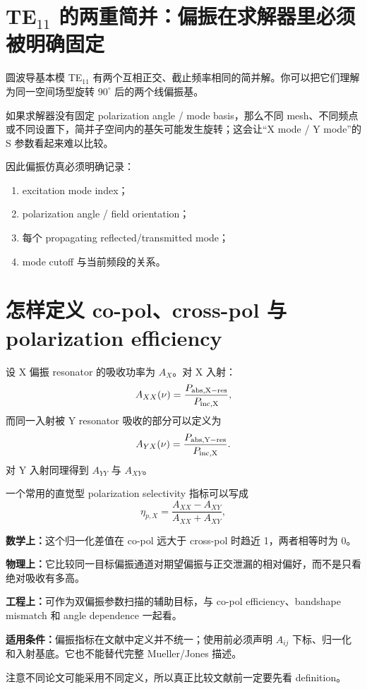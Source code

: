 \documentclass[11pt,a4paper,openany]{ctexrep}
\newcommand{\formulaexplain}[4]{%
\begin{formulaguidebox}
\textbf{\color{KidBlue}数学上：}#1\par
\textbf{\color{KidTeal}物理上：}#2\par
\textbf{\color{KidGold!55!black}工程上：}#3\par
\textbf{\color{KidRed}适用条件：}#4
\end{formulaguidebox}%
}
\begin{document}
\section{TE$_{11}$ 的两重简并：偏振在求解器里必须被明确固定}

圆波导基本模 TE$_{11}$ 有两个互相正交、截止频率相同的简并解。你可以把它们理解为同一空间场型旋转 $90^\circ$ 后的两个线偏振基。

\begin{center}
\end{center}

如果求解器没有固定 polarization angle / mode basis，那么不同 mesh、不同频点或不同设置下，简并子空间内的基矢可能发生旋转；这会让“X mode / Y mode”的 S 参数看起来难以比较。

因此偏振仿真必须明确记录：
\begin{enumerate}
  \item excitation mode index；
  \item polarization angle / field orientation；
  \item 每个 propagating reflected/transmitted mode；
  \item mode cutoff 与当前频段的关系。
\end{enumerate}

\section{怎样定义 co-pol、cross-pol 与 polarization efficiency}

设 X 偏振 resonator 的吸收功率为 $A_X$。对 X 入射：
\[
A_{XX}(\nu)=\frac{P_{\rm abs,X-res}}{P_{\rm inc,X}},
\]
而同一入射被 Y resonator 吸收的部分可以定义为
\[
A_{YX}(\nu)=\frac{P_{\rm abs,Y-res}}{P_{\rm inc,X}}.
\]
对 Y 入射同理得到 $A_{YY}$ 与 $A_{XY}$。

一个常用的直觉型 polarization selectivity 指标可以写成
\[
\eta_{p,X}=\frac{A_{XX}-A_{XY}}{A_{XX}+A_{XY}},
\]
\formulaexplain
{这个归一化差值在 co-pol 远大于 cross-pol 时趋近 1，两者相等时为 0。}
{它比较同一目标偏振通道对期望偏振与正交泄漏的相对偏好，而不是只看绝对吸收有多高。}
{可作为双偏振参数扫描的辅助目标，与 co-pol efficiency、bandshape mismatch 和 angle dependence 一起看。}
{偏振指标在文献中定义并不统一；使用前必须声明 $A_{ij}$ 下标、归一化和入射基底。它也不能替代完整 Mueller/Jones 描述。}
注意不同论文可能采用不同定义，所以真正比较文献前一定要先看 definition。
\end{document}
